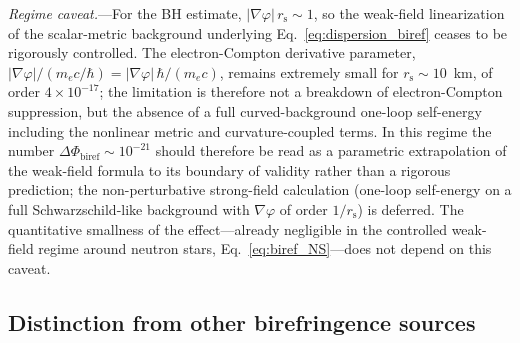 \documentclass[aps,prd,onecolumn,superscriptaddress,nofootinbib,showpacs,12pt,notitlepage]{revtex4-2}
\newcommand{\rs}{r_{\mathrm{s}}}
\begin{document}
\textit{Regime caveat.}---For the BH estimate,
$|\nabla\varphi|\,\rs \sim 1$, so the weak-field linearization
of the scalar-metric background underlying
Eq.~\eqref{eq:dispersion_biref} ceases to be rigorously
controlled.  The electron-Compton derivative parameter,
$|\nabla\varphi|/(m_e c/\hbar)
= |\nabla\varphi|\,\hbar/(m_e c)$, remains extremely small
for $\rs\sim 10$~km, of order $4\times 10^{-17}$; the
limitation is therefore not a breakdown of electron-Compton
suppression, but the absence of a full curved-background
one-loop self-energy including the nonlinear metric and
curvature-coupled terms.  In this regime the number
$\Delta\Phi_{\mathrm{biref}}\sim 10^{-21}$ should therefore be read
as a parametric extrapolation of the weak-field formula to its
boundary of validity rather than a rigorous prediction; the
non-perturbative strong-field calculation (one-loop self-energy
on a full Schwarzschild-like background with $\nabla\varphi$ of
order $1/\rs$) is deferred.  The quantitative smallness of the
effect---already negligible in the controlled weak-field regime
around neutron stars, Eq.~\eqref{eq:biref_NS}---does not depend
on this caveat.

\subsection{Distinction from other birefringence sources}
\label{sec:biref_distinction}
\end{document}
